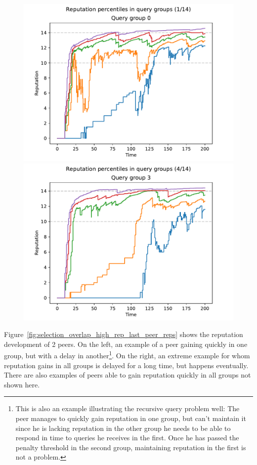 \begin{figure}[t]
\centering
\includegraphics[width=0.5\columnwidth]{figures/selection_overlap_high_rep_last_rep_percs_1_of_14}%
\includegraphics[width=0.5\columnwidth]{figures/selection_overlap_high_rep_last_rep_percs_4_of_14}
\label{fig:selection_overlap_high_rep_last_rep_percs}
\end{figure}

Figure~\ref{fig:selection_overlap_high_rep_last_peer_reps} shows the reputation
development of 2 peers. On the left, an example of a peer gaining quickly in one
group, but with a delay in another\footnote{This is also an example illustrating
the recursive query problem well: The peer manages to quickly gain reputation in
one group, but can't maintain it since he is lacking reputation in the other
group he needs to be able to respond in time to queries he receives in the
first. Once he has passed the penalty threshold in the second group, maintaining
reputation in the first is not a problem.}. On the right, an extreme example for
whom reputation gains in all groups is delayed for a long time, but happens
eventually. There are also examples of peers able to gain reputation quickly in
all groups not shown here.

